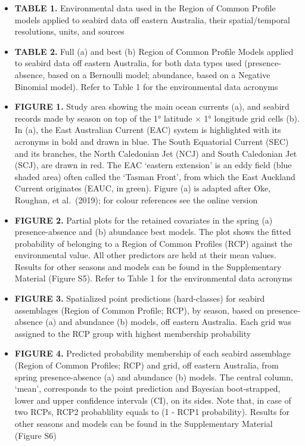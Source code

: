 \documentclass{article}
\providecommand{\tightlist}{%
  \setlength{\itemsep}{0pt}\setlength{\parskip}{0pt}}
\begin{document}
\begin{linenumbers}
\begin{itemize}
\tightlist
\item
  \textbf{TABLE 1.} Environmental data used in the Region of Common Profile models applied to seabird data off eastern Australia, their spatial/temporal resolutions, units, and sources
\item
  \textbf{TABLE 2.} Full (a) and best (b) Region of Common Profile Models applied to seabird data off eastern Australia, for both data types used (presence-absence, based on a Bernoulli model; abundance, based on a Negative Binomial model). Refer to Table 1 for the environmental data acronyms
\item
  \textbf{FIGURE 1.} Study area showing the main ocean currents (a), and seabird records made by season on top of the 1° latitude × 1° longitude grid cells (b). In (a), the East Australian Current (EAC) system is highlighted with its acronyms in bold and drawn in blue. The South Equatorial Current (SEC) and its branches, the North Caledonian Jet (NCJ) and South Caledonian Jet (SCJ), are drawn in red. The EAC `eastern extension' is an eddy field (blue shaded area) often called the `Tasman Front', from which the East Auckland Current originates (EAUC, in green). Figure (a) is adapted after Oke, Roughan, et al.~(2019); for colour references see the online version
\item
  \textbf{FIGURE 2.} Partial plots for the retained covariates in the spring (a) presence-absence and (b) abundance best models. The plot shows the fitted probability of belonging to a Region of Common Profiles (RCP) against the environmental value. All other predictors are held at their mean values. Results for other seasons and models can be found in the Supplementary Material (Figure S5). Refer to Table 1 for the environmental data acronyms
\item
  \textbf{FIGURE 3.} Spatialized point predictions (hard-classes) for seabird assemblages (Region of Common Profile; RCP), by season, based on presence-absence (a) and abundance (b) models, off eastern Australia. Each grid was assigned to the RCP group with highest membership probability
\item
  \textbf{FIGURE 4.} Predicted probability membership of each seabird assemblage (Region of Common Profiles; RCP) and grid, off eastern Australia, from spring presence-absence (a) and abundance (b) models. The central column, `mean', corresponds to the point prediction and Bayesian boot-strapped, lower and upper confidence intervals (CI), on its sides. Note that, in case of two RCPs, RCP2 probablility equals to (1 - RCP1 probability). Results for other seasons and models can be found in the Supplementary Material (Figure S6)

\end{itemize}
\end{linenumbers}
\end{document}
